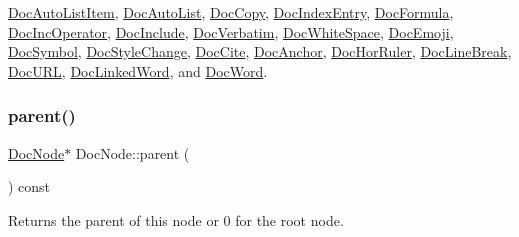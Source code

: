 \mbox{\hyperlink{class_doc_auto_list_item_a4a405f6baad7d2ddb30df82ab73d7ab5}{Doc\+Auto\+List\+Item}}, \mbox{\hyperlink{class_doc_auto_list_af7e24f8b1cfb9b2c6ee150e0d3da70ac}{Doc\+Auto\+List}}, \mbox{\hyperlink{class_doc_copy_ac389e4de240c92f7c2a9f4183f033cdf}{Doc\+Copy}}, \mbox{\hyperlink{class_doc_index_entry_a246d8de74105d446f2544b8aa51be833}{Doc\+Index\+Entry}}, \mbox{\hyperlink{class_doc_formula_a58d06fddf5654083666a10e02e746e78}{Doc\+Formula}}, \mbox{\hyperlink{class_doc_inc_operator_a3534f7134847af9d29b60cbf308d0955}{Doc\+Inc\+Operator}}, \mbox{\hyperlink{class_doc_include_a947c64f6a61138a4790ebc8bffbda3e3}{Doc\+Include}}, \mbox{\hyperlink{class_doc_verbatim_a3c7e3c656ba8812a29eb68e99bd96e46}{Doc\+Verbatim}}, \mbox{\hyperlink{class_doc_white_space_a8cc06255a7e2dc0f4d23567568235410}{Doc\+White\+Space}}, \mbox{\hyperlink{class_doc_emoji_a9b09bd07ad077b411254b04ce695ef12}{Doc\+Emoji}}, \mbox{\hyperlink{class_doc_symbol_a721838cea5944bbdc1b8dfddc0242062}{Doc\+Symbol}}, \mbox{\hyperlink{class_doc_style_change_afcb88a076f2cabaeb4b6b10571d1a6b4}{Doc\+Style\+Change}}, \mbox{\hyperlink{class_doc_cite_a7f645fd99570ca0533c2e7087ae18bbd}{Doc\+Cite}}, \mbox{\hyperlink{class_doc_anchor_aec825aa865b67f496e610281f2cf1f51}{Doc\+Anchor}}, \mbox{\hyperlink{class_doc_hor_ruler_a83e7a63cc940456a77e1774727089d18}{Doc\+Hor\+Ruler}}, \mbox{\hyperlink{class_doc_line_break_a1de15f513561ed6a15cad2fdc3b6e8c6}{Doc\+Line\+Break}}, \mbox{\hyperlink{class_doc_u_r_l_a030f1583c90947d5fb00be872c094183}{Doc\+U\+RL}}, \mbox{\hyperlink{class_doc_linked_word_aef22b3a37583c764a6be0ed1a1ff6dd5}{Doc\+Linked\+Word}}, and \mbox{\hyperlink{class_doc_word_a9a2af8f2baad39c39a8b1e958e453351}{Doc\+Word}}.

\mbox{\label{class_doc_node_a73e8ad29a91cfceb0968eb00db71a23d}} 
\subsubsection{\texorpdfstring{parent()}{parent()}}
{\footnotesize\ttfamily \mbox{\hyperlink{class_doc_node}{Doc\+Node}}$\ast$ Doc\+Node\+::parent (\begin{DoxyParamCaption}{ }\end{DoxyParamCaption}) const\hspace{0.3cm}{\ttfamily [inline]}}

Returns the parent of this node or 0 for the root node. \mbox{\label{class_doc_node_a7059408f429dc1358764e334079ca986}} 
